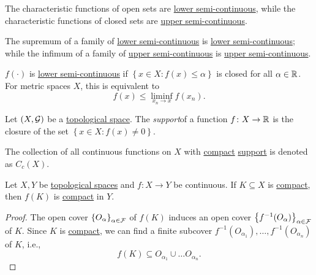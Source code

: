 \begin{remark}
	The characteristic functions of open sets are \hyperref[def:lower-semi-continuous]{lower semi-continuous}, while the characteristic functions of closed sets are \hyperref[def:upper-semi-continuous]{upper semi-continuous}.
\end{remark}

\begin{remark}
	The supremum of a family of \hyperref[def:lower-semi-continuous]{lower semi-continuous} is \hyperref[def:lower-semi-continuous]{lower semi-continuous}; while the infimum of a family of \hyperref[def:upper-semi-continuous]{upper semi-continuous} is \hyperref[def:upper-semi-continuous]{upper semi-continuous}.
\end{remark}

\begin{remark}
	\(f(\cdot)\) is \hyperref[def:lower-semi-continuous]{lower semi-continuous} if \(\left\{ x\in X\colon f(x) \leq \alpha \right\} \) is closed for all \(\alpha \in \mathbb{\MakeUppercase{r}} \). For metric spaces \(X\), this is equivalent to
	\[
		f(x) \leq \liminf_{x_n \to x} f(x_n).
	\]
\end{remark}

\begin{definition}[Support]\label{def:support}
	Let \((X, \mathcal{\MakeUppercase{g}} )\) be a \hyperref[def:topological-space]{topological space}. The \emph{support}of a function \(f\colon X \to \mathbb{\MakeUppercase{r}} \) is the closure of the set \(\left\{ x\in X\colon f(x) \neq 0 \right\}\).
\end{definition}

\begin{notation}
	The collection of all continuous functions on \(X\) with \hyperref[def:compact]{compact} \hyperref[def:support]{support} is denoted as \(C_c(X)\).
\end{notation}

\begin{theorem}\label{thm:lec26}
	Let \(X, Y\) be \hyperref[def:topological-space]{topological spaces} and \(f\colon X \to Y\) be continuous. If \(K \subseteq X\) is \hyperref[def:compact]{compact}, then \(f(K)\) is \hyperref[def:compact]{compact} in \(Y\).
\end{theorem}
\begin{proof}
	The open cover \(\left\{ O_\alpha  \right\}_{\alpha \in \mathcal{\MakeUppercase{f}} } \) of \(f(K)\) induces an open cover \(\left\{ f^{-1} (O_\alpha ) \right\}_{\alpha \in \mathcal{\MakeUppercase{f}} } \) of \(K\). Since \(K\) is \hyperref[def:compact]{compact}, we can find a finite subcover \(f^{-1} (O_{\alpha _1}), \ldots , f^{-1} (O_{\alpha _n}) \) of \(K\), i.e.,
	\[
		f(K) \subseteq O_{\alpha _1} \cup \ldots  O_{\alpha _n}.
	\]
\end{proof}

